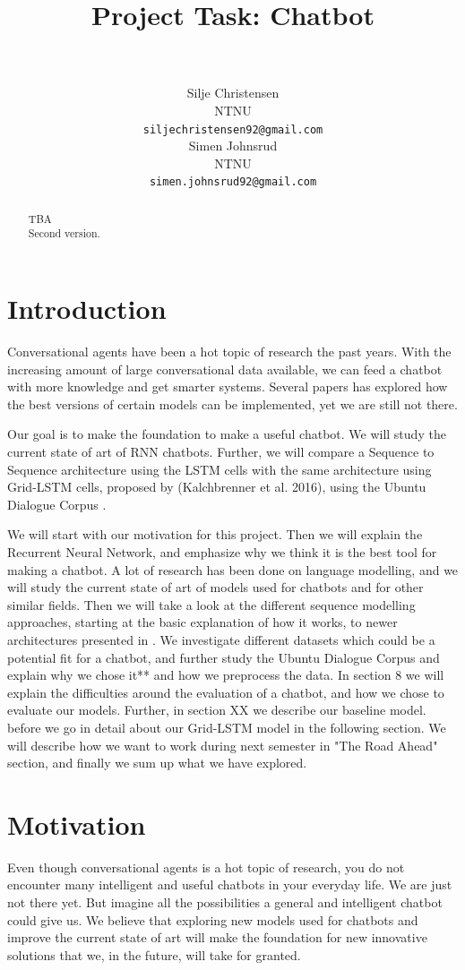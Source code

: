 \documentclass{article} %
\title{Project Task: Chatbot}
\author{
 \\
\texttt{} \\
\AND
Silje Christensen \\
NTNU \\
\texttt{siljechristensen92@gmail.com} \\
\And
Simen Johnsrud \\
NTNU \\
\texttt{simen.johnsrud92@gmail.com} \\
}
\begin{document}
\maketitle

\begin{abstract}
TBA\\
Second version.
\end{abstract}

\section{Introduction}
Conversational agents have been a hot topic of research the past years. With the increasing amount of large conversational data available, we can feed a chatbot with more knowledge and get smarter systems. Several papers has explored how the best versions of certain models can be implemented, yet we are still not there.

Our goal is to make the foundation to make a useful chatbot. We will study the current state of art of RNN chatbots. Further, we will compare a Sequence to Sequence architecture using the LSTM cells with the same architecture using Grid-LSTM cells, proposed by (Kalchbrenner et al. 2016), using the Ubuntu Dialogue Corpus \cite{Ubuntuv2}. 

We will start with our motivation for this project. Then we will explain the Recurrent Neural Network, and emphasize why we think it is the best tool for making a chatbot. A lot of research has been done on language modelling, and we will study the current state of art of models used for chatbots and for other similar fields. Then we will take a look at the different sequence modelling approaches, starting at the basic explanation of how it works, to newer architectures presented in \cite{Kalchbrenner}. We investigate different datasets which could be a potential fit for a chatbot, and further study the Ubuntu Dialogue Corpus \cite{Ubuntuv2} and explain why we chose it** and how we preprocess the data. In section 8 we will explain the difficulties around the evaluation of a chatbot, and how we chose to evaluate our models. Further, in section XX we describe our baseline model. before we go in detail about our Grid-LSTM model in the following section. We will describe how we want to work during next semester in "The Road Ahead" section, and finally we sum up what we have explored. 



\section{Motivation}
Even though conversational agents is a hot topic of research, you do not encounter many intelligent and useful chatbots in your everyday life. We are just not there yet. But imagine all the possibilities a general and intelligent chatbot could give us. We believe that exploring new models used for chatbots and improve the current state of art will make the foundation for new innovative solutions that we, in the future, will take for granted. 
\end{document}
